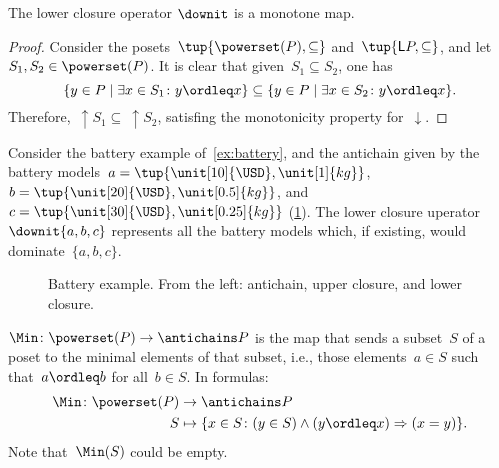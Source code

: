 \begin{lemma}
    The lower closure operator $\downit$ is a monotone map.
\end{lemma}

\begin{proof}
    Consider the posets~$\tup{\powerset(P),\subseteq}$ and~$\tup{\mathsf{L}P,\subseteq}$, and let~$S_1,S_2\in \powerset(P)$. It is clear that given~$S_1\subseteq S_2$, one has
    \begin{equation}
        \{y\in P\mid \exists x\in S_1\colon y\ordleq x\} \subseteq \{y\in P\mid \exists x\in S_2\colon y\ordleq x\}.
    \end{equation}
    Therefore,~$\uparrow S_1\subseteq \ \uparrow S_2$, satisfing the monotonicity property for~$\downarrow$.
\end{proof}



\begin{example}
    Consider the battery example of~\cref{ex:battery}, and the antichain given by the battery models~$a=\tup{\unit[10]{\USD},\unit[1]{kg}}$,~$b=\tup{\unit[20]{\USD},\unit[0.5]{kg}}$, and~$c=\tup{\unit[30]{\USD},\unit[0.25]{kg}}$ (\cref{fig:examplebatt}).
    The lower closure uperator~$\downit\{a,b,c\}$ represents all the battery models which, if existing, would dominate~$\{a,b,c\}$.

\end{example}
\begin{figure}[h!]
    \begin{center}
    \end{center}
    \caption{Battery example. From the left: antichain, upper closure, and lower closure.
    \label{fig:examplebatt}}
\end{figure}


\begin{definition}[Min]
    \label{def:Min}
    $\Min \colon \powerset(P) \to \antichains P$ is the map that sends a subset~$S$ of a poset to the minimal elements of that subset, i.e., those elements~$a \in S$ such that~$a \ordleq b$ for all~$b \in S$. In formulas:
    \begin{equation*}
        \begin{aligned}
            \Min \colon \powerset(P) &\to \antichains P\\
            S&\mapsto \{ x\in S\colon (y\in S)\wedge(y\ordleq x)\Rightarrow (x=y)\}.
        \end{aligned}
    \end{equation*}
    Note that~$\Min(S)$ could be empty.
\end{definition}

